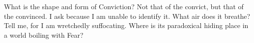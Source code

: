 \documentclass{article}
\begin{document}
What is the shape and form of Conviction? Not that of the convict, but
that of the convinced. I ask because I am unable to identify it. What
air does it breathe? Tell me, for I am wretchedly suffocating. Where is
its paradoxical hiding place in a world boiling with Fear? \newline
\end{document}
